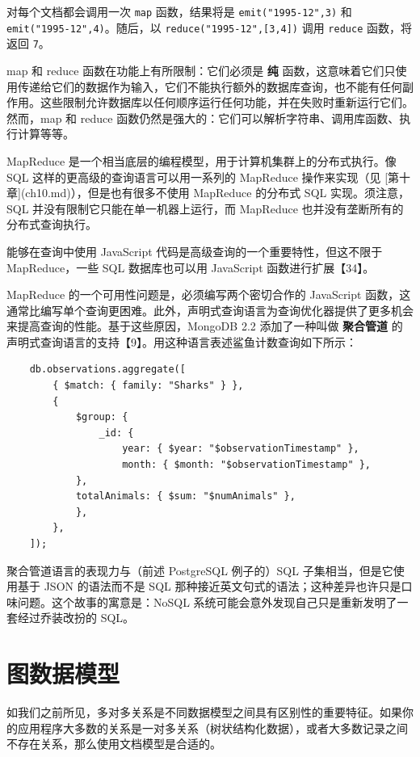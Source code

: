 对每个文档都会调用一次 \texttt{map} 函数，结果将是 \texttt{emit("1995-12",3)} 和 \texttt{emit("1995-12",4)}。随后，以 \texttt{reduce("1995-12",[3,4])} 调用 \texttt{reduce} 函数，将返回 \texttt{7}。

map 和 reduce 函数在功能上有所限制：它们必须是 \textbf{纯} 函数，这意味着它们只使用传递给它们的数据作为输入，它们不能执行额外的数据库查询，也不能有任何副作用。这些限制允许数据库以任何顺序运行任何功能，并在失败时重新运行它们。然而，map 和 reduce 函数仍然是强大的：它们可以解析字符串、调用库函数、执行计算等等。

MapReduce 是一个相当底层的编程模型，用于计算机集群上的分布式执行。像 SQL 这样的更高级的查询语言可以用一系列的 MapReduce 操作来实现（见 [第十章](ch10.md)），但是也有很多不使用 MapReduce 的分布式 SQL 实现。须注意，SQL 并没有限制它只能在单一机器上运行，而 MapReduce 也并没有垄断所有的分布式查询执行。

能够在查询中使用 JavaScript 代码是高级查询的一个重要特性，但这不限于 MapReduce，一些 SQL 数据库也可以用 JavaScript 函数进行扩展【34】。

MapReduce 的一个可用性问题是，必须编写两个密切合作的 JavaScript 函数，这通常比编写单个查询更困难。此外，声明式查询语言为查询优化器提供了更多机会来提高查询的性能。基于这些原因，MongoDB 2.2 添加了一种叫做 \textbf{聚合管道} 的声明式查询语言的支持【9】。用这种语言表述鲨鱼计数查询如下所示：

\begin{lstlisting}
    db.observations.aggregate([
        { $match: { family: "Sharks" } },
        {
            $group: {
                _id: {
                    year: { $year: "$observationTimestamp" },
                    month: { $month: "$observationTimestamp" },
            },
            totalAnimals: { $sum: "$numAnimals" },
            },
        },
    ]);
\end{lstlisting}

聚合管道语言的表现力与（前述 PostgreSQL 例子的）SQL 子集相当，但是它使用基于 JSON 的语法而不是 SQL 那种接近英文句式的语法；这种差异也许只是口味问题。这个故事的寓意是：NoSQL 系统可能会意外发现自己只是重新发明了一套经过乔装改扮的 SQL。

\section{图数据模型}

如我们之前所见，多对多关系是不同数据模型之间具有区别性的重要特征。如果你的应用程序大多数的关系是一对多关系（树状结构化数据），或者大多数记录之间不存在关系，那么使用文档模型是合适的。

